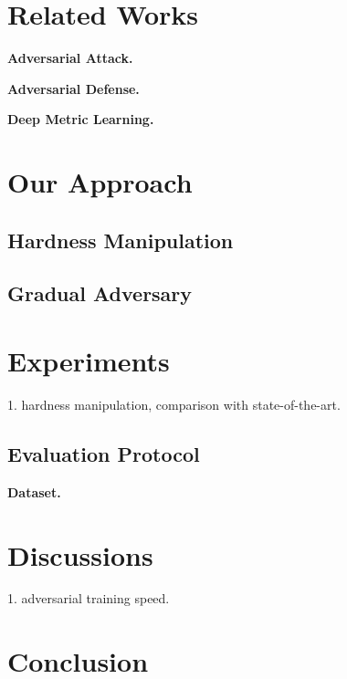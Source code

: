 \documentclass[10pt,twocolumn,letterpaper]{article}
\begin{document}
\section{Related Works}
\label{sec:2}

\textbf{Adversarial Attack.}

\textbf{Adversarial Defense.}

\textbf{Deep Metric Learning.}
\cite{advrank,advorder,robrank}

\section{Our Approach}
\label{sec:3}

\subsection{Hardness Manipulation}

\subsection{Gradual Adversary}

\section{Experiments}
\label{sec:4}

1. hardness manipulation, comparison with state-of-the-art.

\subsection{Evaluation Protocol}

\textbf{Dataset.}

\section{Discussions}
\label{sec:5}

1. adversarial training speed.

\section{Conclusion}
\label{sec:6}

\cite{Authors14}

{\small


}


\end{document}
